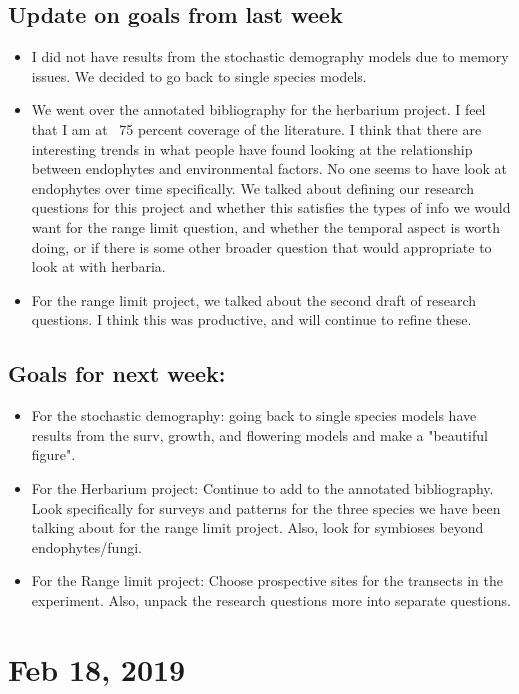 \documentclass{article}
\begin{document}
\subsection*{Update on goals from last week}
\begin{itemize}
\item{I did not have results from the stochastic demography models due to memory issues. We decided to go back to single species models.}
\item{We went over the annotated bibliography for the herbarium project. I feel that I am at ~75 percent coverage of the literature. I think that there are interesting trends in what people have found looking at the relationship between endophytes and environmental factors. No one seems to have look at endophytes over time specifically. We talked about defining our research questions for this project and whether this satisfies the types of info we would want for the range limit question, and whether the temporal aspect is worth doing, or if there is some other broader question that would appropriate to look at with herbaria.}
\item{For the range limit project, we talked about the second draft of research questions. I think this was productive, and will continue to refine these.}
\end{itemize}

\subsection*{Goals for next week:}
\begin{itemize}
\item{For the stochastic demography: going back to single species models have results from the surv, growth, and flowering models and make a "beautiful figure".}
\item{For the Herbarium project: Continue to add to the annotated bibliography. Look specifically for surveys and patterns for the three species we have been talking about for the range limit project. Also, look for symbioses beyond endophytes/fungi.}
\item{For the Range limit project: Choose prospective sites for the transects in the experiment. Also, unpack the research questions more into separate questions.}
\end{itemize}

\section*{Feb 18, 2019}
\end{document}
